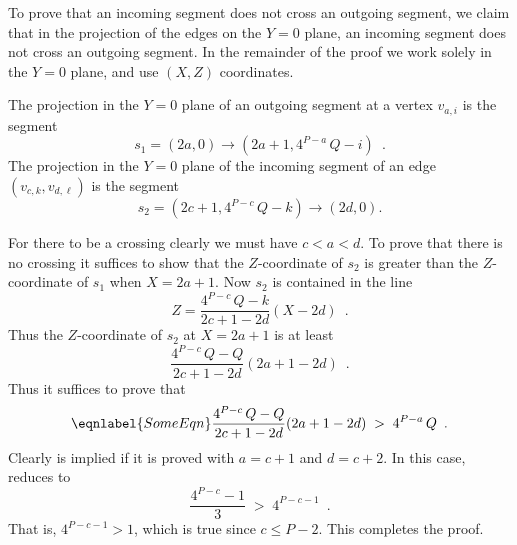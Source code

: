 \documentclass[10pt,a4paper]{article}
\begin{document}
To prove that an incoming segment does not cross an outgoing segment, we claim
that in the projection of the edges on the $Y=0$ plane,  an incoming segment
does not cross an outgoing segment. In the remainder of the proof we work
solely in the $Y=0$ plane, and use $(X,Z)$ coordinates.

The projection in the $Y=0$ plane 
of an outgoing segment at a vertex $v_{a,i}$  is the segment 
\begin{equation*}
s_1=(2a,0)\rightarrow(2a+1,4^{P-a}\,Q-i)\enspace.
\end{equation*}
The projection in the $Y=0$ plane of the incoming segment of an edge
$(v_{c,k},v_{d,\ell})$  is the segment
\begin{equation*}
s_2=(2c+1,4^{P-c}\,Q-k)\rightarrow(2d,0).
\end{equation*}

For there to be a crossing clearly we must have $c<a<d$. To prove that there is
no crossing it suffices to show that the $Z$-coordinate of $s_2$ is greater
than the $Z$-coordinate of $s_1$ when $X=2a+1$.
Now $s_2$ is contained in the line 
\begin{equation*}
Z=\frac{4^{P-c}\,Q-k}{2c+1-2d}(X-2d)\enspace.
\end{equation*}
Thus the $Z$-coordinate of $s_2$ at $X=2a+1$ is at least
\begin{equation*}
\frac{4^{P-c}\,Q-Q}{2c+1-2d}(2a+1-2d)\enspace.
\end{equation*}
Thus it suffices to prove that 
\begin{equation}
\eqnlabel{SomeEqn}
\frac{4^{P-c}\,Q-Q}{2c+1-2d}(2a+1-2d)\;>\;4^{P-a}\,Q\enspace.
\end{equation}
Clearly  is implied if it is proved with $a=c+1$ and $d=c+2$.
In this case,  reduces to
\begin{equation*}
\frac{4^{P-c}-1}{3}\;>\;4^{P-c-1}\enspace.
\end{equation*}
That is,
$4^{P-c-1}>1$,
which is true since $c\leq P-2$.
This completes the proof.



\end{document}
